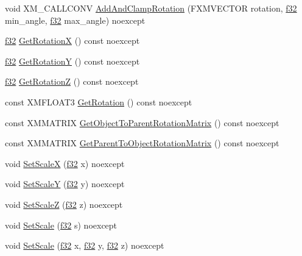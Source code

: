 \begin{DoxyCompactItemize}
\item 
void X\+M\+\_\+\+C\+A\+L\+L\+C\+O\+NV \hyperlink{structmage_1_1_transform_node_af6b6b0982cf1206a0fba09cb84c382bd}{Add\+And\+Clamp\+Rotation} (F\+X\+M\+V\+E\+C\+T\+OR rotation, \hyperlink{namespacemage_a6a44ad388483959dc4dff9f2aef91431}{f32} min\+\_\+angle, \hyperlink{namespacemage_a6a44ad388483959dc4dff9f2aef91431}{f32} max\+\_\+angle) noexcept
\item 
\hyperlink{namespacemage_a6a44ad388483959dc4dff9f2aef91431}{f32} \hyperlink{structmage_1_1_transform_node_a79d341ca59732b0852b71a3915f7d2c2}{Get\+RotationX} () const noexcept
\item 
\hyperlink{namespacemage_a6a44ad388483959dc4dff9f2aef91431}{f32} \hyperlink{structmage_1_1_transform_node_ae4bac5f8b18c06fcee3b81874b438798}{Get\+RotationY} () const noexcept
\item 
\hyperlink{namespacemage_a6a44ad388483959dc4dff9f2aef91431}{f32} \hyperlink{structmage_1_1_transform_node_a9cbdf5924ac2d100cef5d03e031de3ac}{Get\+RotationZ} () const noexcept
\item 
const X\+M\+F\+L\+O\+A\+T3 \hyperlink{structmage_1_1_transform_node_ae785911d718434387199a92c6966a9b7}{Get\+Rotation} () const noexcept
\item 
const X\+M\+M\+A\+T\+R\+IX \hyperlink{structmage_1_1_transform_node_a07d6171d757d2f7fbf0d2d59dbe531d9}{Get\+Object\+To\+Parent\+Rotation\+Matrix} () const noexcept
\item 
const X\+M\+M\+A\+T\+R\+IX \hyperlink{structmage_1_1_transform_node_a6a5c82910f5f6395a74bddf3d564547c}{Get\+Parent\+To\+Object\+Rotation\+Matrix} () const noexcept
\item 
void \hyperlink{structmage_1_1_transform_node_a02e925b95719497e34f42d94075e2fc2}{Set\+ScaleX} (\hyperlink{namespacemage_a6a44ad388483959dc4dff9f2aef91431}{f32} x) noexcept
\item 
void \hyperlink{structmage_1_1_transform_node_a16901f924368102c0c8fef0646cb46c9}{Set\+ScaleY} (\hyperlink{namespacemage_a6a44ad388483959dc4dff9f2aef91431}{f32} y) noexcept
\item 
void \hyperlink{structmage_1_1_transform_node_ac3ab1b71a6e4a3196c35b3d092c967ae}{Set\+ScaleZ} (\hyperlink{namespacemage_a6a44ad388483959dc4dff9f2aef91431}{f32} z) noexcept
\item 
void \hyperlink{structmage_1_1_transform_node_a225bc04b951eb62e26bc6effc94c4c87}{Set\+Scale} (\hyperlink{namespacemage_a6a44ad388483959dc4dff9f2aef91431}{f32} s) noexcept
\item 
void \hyperlink{structmage_1_1_transform_node_af1d2daa077dbf9b4bc199387f7df9f14}{Set\+Scale} (\hyperlink{namespacemage_a6a44ad388483959dc4dff9f2aef91431}{f32} x, \hyperlink{namespacemage_a6a44ad388483959dc4dff9f2aef91431}{f32} y, \hyperlink{namespacemage_a6a44ad388483959dc4dff9f2aef91431}{f32} z) noexcept

\end{DoxyCompactItemize}
